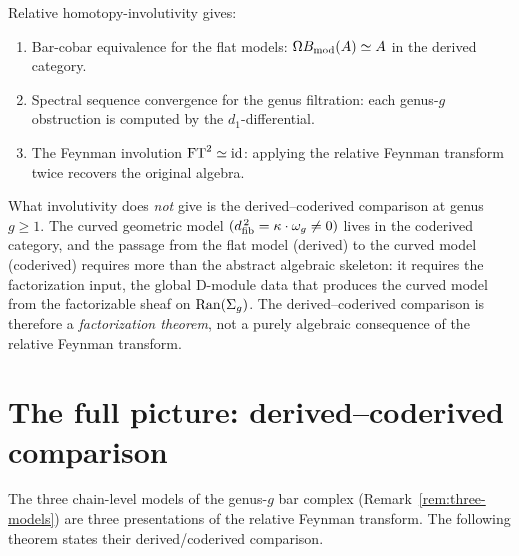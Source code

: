 \begin{remark}
\label{rem:rft-involutivity-scope}
Relative homotopy-involutivity gives:
\begin{enumerate}[label=\textup{(\roman*)}]
\item Bar-cobar equivalence for the flat models:
 $\Omega B_{\mathrm{mod}}(A) \simeq A$ in the derived category.
\item Spectral sequence convergence for the genus filtration:
 each genus-$g$ obstruction is computed by the
 $d_1$-differential.
\item The Feynman involution $\mathrm{FT}^2 \simeq \operatorname{id}$:
 applying the relative Feynman transform twice recovers the
 original algebra.
\end{enumerate}
What involutivity does \emph{not} give is the
derived--coderived comparison at genus $g \ge 1$. The curved
geometric model $(d_{\mathrm{fib}}^{\,2} = \kappa \cdot \omega_g \neq 0)$
lives in the coderived category, and the passage from the flat
model (derived) to the curved model (coderived) requires more
than the abstract algebraic skeleton: it requires the
factorization input, the global D-module data that produces
the curved model from the factorizable sheaf on
$\operatorname{Ran}(\Sigma_g)$. The derived--coderived comparison is
therefore a \emph{factorization theorem}, not a purely algebraic
consequence of the relative Feynman transform.
\end{remark}

\section{The full picture: derived--coderived comparison}
\label{sec:rft-full-picture}

The three chain-level models of the genus-$g$ bar complex
(Remark~\ref{rem:three-models}) are three presentations of the relative
Feynman transform. The following theorem states their
derived/coderived comparison.


